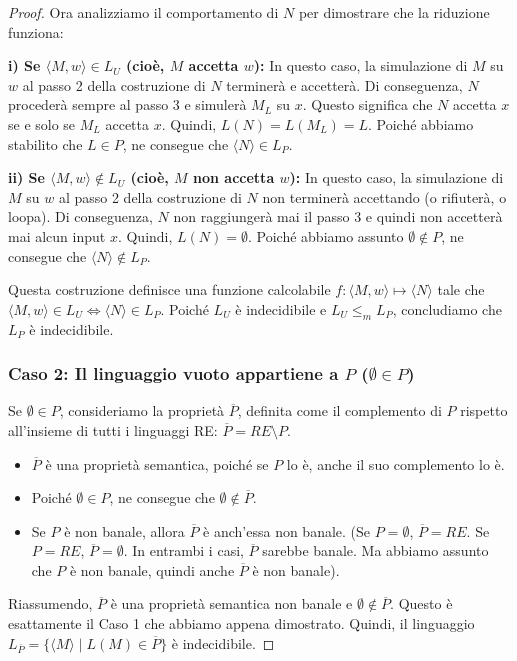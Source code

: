 \documentclass[a4paper]{article}
\theoremstyle{definition} %
\begin{document}
\begin{proof}
Ora analizziamo il comportamento di $N$ per dimostrare che la riduzione funziona:

\textbf{i) Se $\langle M,w \rangle \in L_U$ (cioè, $M$ accetta $w$):}
In questo caso, la simulazione di $M$ su $w$ al passo 2 della costruzione di $N$ terminerà e accetterà. Di conseguenza, $N$ procederà sempre al passo 3 e simulerà $M_L$ su $x$. Questo significa che $N$ accetta $x$ se e solo se $M_L$ accetta $x$.
Quindi, $L(N) = L(M_L) = L$.
Poiché abbiamo stabilito che $L \in P$, ne consegue che $\langle N \rangle \in L_P$.

\textbf{ii) Se $\langle M,w \rangle \notin L_U$ (cioè, $M$ non accetta $w$):}
In questo caso, la simulazione di $M$ su $w$ al passo 2 della costruzione di $N$ non terminerà accettando (o rifiuterà, o loopa). Di conseguenza, $N$ non raggiungerà mai il passo 3 e quindi non accetterà mai alcun input $x$.
Quindi, $L(N) = \emptyset$.
Poiché abbiamo assunto $\emptyset \notin P$, ne consegue che $\langle N \rangle \notin L_P$.

Questa costruzione definisce una funzione calcolabile $f: \langle M,w \rangle \mapsto \langle N \rangle$ tale che $\langle M,w \rangle \in L_U \iff \langle N \rangle \in L_P$. Poiché $L_U$ è indecidibile e $L_U \le_m L_P$, concludiamo che $L_P$ è indecidibile.

\subsubsection{Caso 2: Il linguaggio vuoto appartiene a $P$ ($\emptyset \in P$)}
Se $\emptyset \in P$, consideriamo la proprietà $\overline{P}$, definita come il complemento di $P$ rispetto all'insieme di tutti i linguaggi RE: $\overline{P} = RE \setminus P$.
\begin{itemize}
    \item $\overline{P}$ è una proprietà semantica, poiché se $P$ lo è, anche il suo complemento lo è.
    \item Poiché $\emptyset \in P$, ne consegue che $\emptyset \notin \overline{P}$.
    \item Se $P$ è non banale, allora $\overline{P}$ è anch'essa non banale. (Se $P = \emptyset$, $\overline{P} = RE$. Se $P = RE$, $\overline{P} = \emptyset$. In entrambi i casi, $\overline{P}$ sarebbe banale. Ma abbiamo assunto che $P$ è non banale, quindi anche $\overline{P}$ è non banale).
\end{itemize}
Riassumendo, $\overline{P}$ è una proprietà semantica non banale e $\emptyset \notin \overline{P}$. Questo è esattamente il Caso 1 che abbiamo appena dimostrato. Quindi, il linguaggio $L_{\overline{P}} = \{\langle M \rangle \mid L(M) \in \overline{P}\}$ è indecidibile.


\end{proof}
\end{document}
